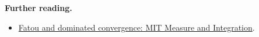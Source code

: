 \documentclass[preprint,12pt,aps,pra,showkeys,amsmath,amssymb,superscriptaddress,floatfix]{revtex4-2}
\theoremstyle{definition}
\theoremstyle{remark}
\providecommand{\tightlist}{\setlength{\itemsep}{2pt}\setlength{\parskip}{0pt}}
\begin{document}
\par\smallskip\begingroup\small\linespread{1.0}\selectfont\noindent\textbf{Further reading.} \begin{itemize}
\tightlist
\item
  \href{https://ocw.mit.edu/courses/18-125-measure-and-integration-fall-2003/pages/lecture-notes/}{Fatou
  and dominated convergence: MIT Measure and Integration}.
\end{itemize}\par\endgroup
\end{document}
